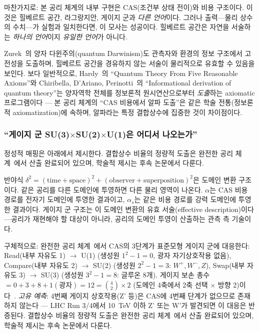 \documentclass[entropy,article,submit,pdftex,oneauthor]{Definitions/mdpi}
\begin{document}
마찬가지로: 본 공리 체계의 내부 구현은 CAS(조건부 상태 전이)와 비용 구조이다. 이것은 힐베르트 공간, 라그랑지안, 게이지 군과 \emph{다른 언어}이다. 그러나 출력---물리 상수의 수치---가 실험과 일치한다면, 이 모사는 성공이다. 힐베르트 공간은 자연을 서술하는 \emph{하나의 언어}이지 \emph{유일한 언어}가 아니다.

Zurek~\cite{zurek2009}의 양자 다윈주의(quantum Darwinism)도 관측자와 환경의 정보 구조에서 고전성을 도출하며, 힐베르트 공간을 경유하지 않는 서술이 물리적으로 유효할 수 있음을 보인다. 보다 일반적으로, Hardy~\cite{hardy2001}의 ``Quantum Theory From Five Reasonable Axioms''와 Chiribella, D'Ariano, Perinotti~\cite{cdp2011}의 ``Informational derivation of quantum theory''는 양자역학 전체를 정보론적 원시연산으로부터 \emph{도출}하는 axiomatic 프로그램이다 --- 본 공리 체계의 ``CAS 비용에서 알파 도출''은 같은 학술 전통(정보론적 axiomatization)에 속하며, 알파라는 특정 결합상수에 집중한 것이 차이점이다.

\subsubsection{``게이지 군 SU(3)$\times$SU(2)$\times$U(1)은 어디서 나오는가''}

정성적 매핑은 아래에서 제시한다. 결합상수 비율의 정량적 도출은 완전한 공리 체계~\cite{han2026}에서 산출 완료되어 있으며, 학술적 제시는 후속 논문에서 다룬다.

반야식 $\delta^2 = (\mathrm{time}+\mathrm{space})^2 + (\mathrm{observer}+\mathrm{superposition})^2$은 도메인 변환 구조이다. 같은 공리를 다른 도메인에 투영하면 다른 물리 영역이 나온다. $\alpha$는 CAS 비용 경로를 전자기 도메인에 투영한 결과이고, $\alpha_s$는 같은 비용 경로를 강력 도메인에 투영한 결과이다. 게이지 군 구조는 이 도메인 변환의 유효 서술(effective description)이다---공리가 재현해야 할 대상이 아니라, 공리의 도메인 투영이 산출하는 관측 측 기술이다.

구체적으로: 완전한 공리 체계~\cite{han2026}에서 CAS의 3단계가 표준모형 게이지 군에 대응한다: Read(내부 자유도 1) $\to$ U(1) (생성원 $1^2 - 1 = 0$, 광자 자기상호작용 없음), Compare(내부 자유도 2) $\to$ SU(2) (생성원 $2^2 - 1 = 3$: $W^+, W^-, Z$), Swap(내부 자유도 3) $\to$ SU(3) (생성원 $3^2 - 1 = 8$: 글루온 8개). 게이지 보손 총수 $= 0 + 3 + 8 + 1(\text{광자}) = 12 = \binom{4}{2} \times 2$ (도메인 4축에서 2축 선택 $\times$ 방향 2)이다~\cite{han2026}. \emph{고유 예측}: 4번째 게이지 상호작용(Z' 등)은 CAS에 4번째 단계가 없으므로 존재하지 않는다 --- LHC Run 3/4에서 10~TeV 이하 Z' 또는 W'가 발견되면 이 대응은 반증된다. 결합상수 비율의 정량적 도출은 완전한 공리 체계~\cite{han2026}에서 산출 완료되어 있으며, 학술적 제시는 후속 논문에서 다룬다.
\end{document}
